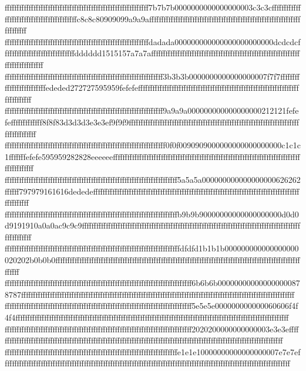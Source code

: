 {{{ffffffffffffffffffffffffffffffffffffffffffffffffffffffffffff7b7b7b0000000000000000003c3c3cffffffffffffffffffffffffffffffffffffffffffc8c8c80909099a9a9affffffffffffffffffffffffffffffffffffffffffffffffffffffffffffffffffffffff
ffffffffffffffffffffffffffffffffffffffffffffffffffffffffffffdadada000000000000000000000000dcdcdcffffffffffffffffffffffffffffffdddddd1515157a7a7affffffffffffffffffffffffffffffffffffffffffffffffffffffffffffffffffffffffffffff
ffffffffffffffffffffffffffffffffffffffffffffffffffffffffffffffffff3b3b3b0000000000000000007f7f7fffffffffffffffffffffffffededed272727595959fefefeffffffffffffffffffffffffffffffffffffffffffffffffffffffffffffffffffffffffffffff
ffffffffffffffffffffffffffffffffffffffffffffffffffffffffffffffffff9a9a9a000000000000000000212121fefefefffffffffffff8f8f83d3d3d3e3e3ef9f9f9ffffffffffffffffffffffffffffffffffffffffffffffffffffffffffffffffffffffffffffffffffff
fffffffffffffffffffffffffffffffffffffffffffffffffffffffffffffffffff0f0f0090909000000000000000000c1c1c1fffffffefefe595959282828eeeeeeffffffffffffffffffffffffffffffffffffffffffffffffffffffffffffffffffffffffffffffffffffffffff
ffffffffffffffffffffffffffffffffffffffffffffffffffffffffffffffffffffffff5a5a5a000000000000000000626262ffffff797979161616dededeffffffffffffffffffffffffffffffffffffffffffffffffffffffffffffffffffffffffffffffffffffffffffffffff
ffffffffffffffffffffffffffffffffffffffffffffffffffffffffffffffffffffffffb9b9b90000000000000000000d0d0d9191910a0a0ac9c9c9ffffffffffffffffffffffffffffffffffffffffffffffffffffffffffffffffffffffffffffffffffffffffffffffffffffff
fffffffffffffffffffffffffffffffffffffffffffffffffffffffffffffffffffffffffdfdfd1b1b1b000000000000000000020202b0b0b0ffffffffffffffffffffffffffffffffffffffffffffffffffffffffffffffffffffffffffffffffffffffffffffffffffffffffffff
ffffffffffffffffffffffffffffffffffffffffffffffffffffffffffffffffffffffffffffff6b6b6b000000000000000000878787ffffffffffffffffffffffffffffffffffffffffffffffffffffffffffffffffffffffffffffffffffffffffffffffffffffffffffffffffff
ffffffffffffffffffffffffffffffffffffffffffffffffffffffffffffffffffffffffffffff5e5e5e000000000000060606f4f4f4ffffffffffffffffffffffffffffffffffffffffffffffffffffffffffffffffffffffffffffffffffffffffffffffffffffffffffffffffff
ffffffffffffffffffffffffffffffffffffffffffffffffffffffffffffffffffffffffffffff2020200000000000003e3e3effffffffffffffffffffffffffffffffffffffffffffffffffffffffffffffffffffffffffffffffffffffffffffffffffffffffffffffffffffffff
ffffffffffffffffffffffffffffffffffffffffffffffffffffffffffffffffffffffffe1e1e10000000000000000007e7e7effffffffffffffffffffffffffffffffffffffffffffffffffffffffffffffffffffffffffffffffffffffffffffffffffffffffffffffffffffffff
}}}

